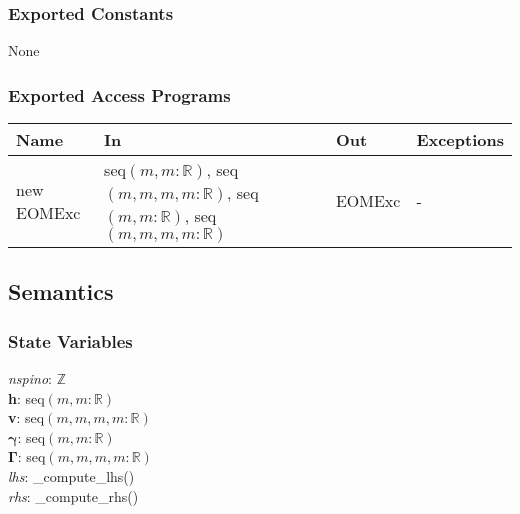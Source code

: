 \documentclass[12pt, titlepage]{article}
\begin{document}
\subsubsection{Exported Constants}
None

\subsubsection{Exported Access Programs}

\begin{center}
	\begin{tabular}{p{2.3cm} p{4cm} p{4cm} p{2cm}}
		\hline
		\textbf{Name} & \textbf{In} & \textbf{Out} & \textbf{Exceptions} \\
		\hline
		new EOMExc & seq$(m,m:\mathbb{R})$, seq$(m,m,m,m:\mathbb{R})$, 
		seq$(m,m:\mathbb{R})$, seq$(m,m,m,m:\mathbb{R})$& EOMExc & - \\
		\hline
	\end{tabular}
\end{center}

\subsection{Semantics}

\subsubsection{State Variables}
\textit{nspino}: $\mathbb{Z}$\\
\textbf{h}: seq$(m,m:\mathbb{R})$\\
\textbf{v}: seq$(m,m,m,m:\mathbb{R})$\\
$\boldsymbol{\gamma}$: seq$(m,m:\mathbb{R})$\\
$\boldsymbol{\Gamma}$: seq$(m,m,m,m:\mathbb{R})$\\
\textit{lhs}: \_compute\_lhs()\\
\textit{rhs}: \_compute\_rhs()
\end{document}
